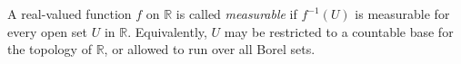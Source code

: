 A real-valued function $f$ on $\mathbb{R}$ is called \emph{measurable} if $f^{-1}(U)$ is measurable for every open set $U$ in $\mathbb{R}$. Equivalently, $U$ may be restricted to a countable base for the topology of $\mathbb{R}$, or allowed to run over all Borel sets.
